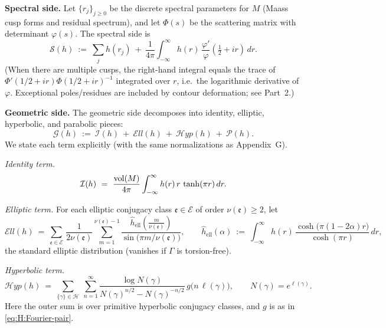 \medskip
\noindent\textbf{Spectral side.}
Let $\{r_j\}_{j\ge 0}$ be the discrete spectral parameters for $M$ (Maass cusp forms and residual spectrum),
and let $\Phi(s)$ be the scattering matrix with determinant $\varphi(s)$. The spectral side is
\begin{equation}\label{eq:H:spec-side}
\mathcal S(h)\ :=\ \sum_{j} h(r_j)
\ +\ \frac{1}{4\pi}\int_{-\infty}^{\infty} h(r)\,
\frac{\varphi'}{\varphi}\!\left(\tfrac12+ir\right)\,dr.
\end{equation}
(When there are multiple cusps, the right-hand integral equals the trace of
$\Phi'(1/2+ir)\Phi(1/2+ir)^{-1}$ integrated over $r$, i.e.\ the logarithmic derivative of
$\varphi$. Exceptional poles/residues are included by contour deformation; see Part~2.)

\medskip
\noindent\textbf{Geometric side.}
The geometric side decomposes into identity, elliptic, hyperbolic, and parabolic pieces:
\begin{equation}\label{eq:H:geom-side-master}
\mathcal G(h)\ :=\ \mathcal I(h)\ +\ \mathcal E\!ll(h)\ +\ \mathcal H\!yp(h)\ +\ \mathcal P(h).
\end{equation}
We state each term explicitly (with the same normalizations as Appendix~G).

\medskip
\emph{Identity term.}
\begin{equation}\label{eq:H:identity}
\mathcal I(h)\ =\ \frac{\operatorname{vol}(M)}{4\pi}\int_{-\infty}^{\infty} h(r)\, r\,\tanh(\pi r)\,dr.
\end{equation}

\medskip
\emph{Elliptic term.}
For each elliptic conjugacy class $\mathfrak e\in\mathcal E$ of order $\nu(\mathfrak e)\ge 2$,
let
\begin{equation}\label{eq:H:elliptic}
\mathcal E\!ll(h)\ =\ \sum_{\mathfrak e\in\mathcal E}\,
\frac{1}{2\nu(\mathfrak e)}\sum_{m=1}^{\nu(\mathfrak e)-1}
\frac{\widehat h_{\mathrm{ell}}\!\left(\tfrac{m}{\nu(\mathfrak e)}\right)}{\sin\!\big(\pi m/\nu(\mathfrak e)\big)},
\qquad
\widehat h_{\mathrm{ell}}(\alpha)\ :=\ \int_{-\infty}^{\infty}
h(r)\,\frac{\cosh\!\big(\pi(1-2\alpha)r\big)}{\cosh(\pi r)}\,dr,
\end{equation}
the standard elliptic distribution (vanishes if $\Gamma$ is torsion-free).

\medskip
\emph{Hyperbolic term.}
\begin{equation}\label{eq:H:hyperbolic}
\mathcal H\!yp(h)\ =\ \sum_{\{\gamma\}\in\mathcal H}\ \sum_{n=1}^{\infty}
\frac{\log N(\gamma)}{N(\gamma)^{n/2}-N(\gamma)^{-n/2}}\,
g\!\big(n\,\ell(\gamma)\big),
\qquad N(\gamma)=e^{\ell(\gamma)}.
\end{equation}
Here the outer sum is over primitive hyperbolic conjugacy classes, and $g$ is as in \eqref{eq:H:Fourier-pair}.

